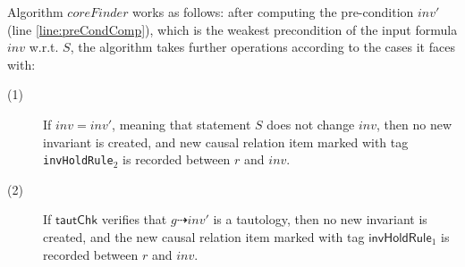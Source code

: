 \documentclass[final]{IEEEtran}
\def \eqc {\doteq }
\def \andc {\barwedge }
\begin{document}
Algorithm $coreFinder$ works as follows: after computing the pre-condition $ inv'$ (line \ref{line:preCondComp}), which is the weakest precondition of the input formula $inv$ w.r.t. $S$, the algorithm takes further operations according to the cases it faces with:

\begin{description}
\item[(1)] If $ inv=inv'$, meaning that statement $S$ does not change $inv$, then no new invariant is created, and  new causal
relation item marked with tag {\tt invHoldRule$_2$} is recorded
between $r$ and $inv$.%

\item[(2)] If $\mathsf{ tautChk}$ verifies that $g \dashrightarrow inv'$ is a tautology, then  no new invariant is created, and
the new causal relation item marked with tag
$ \mathsf{invHoldRule}_1$ is recorded between $r$ and $inv$. %



\end{description}
\end{document}
